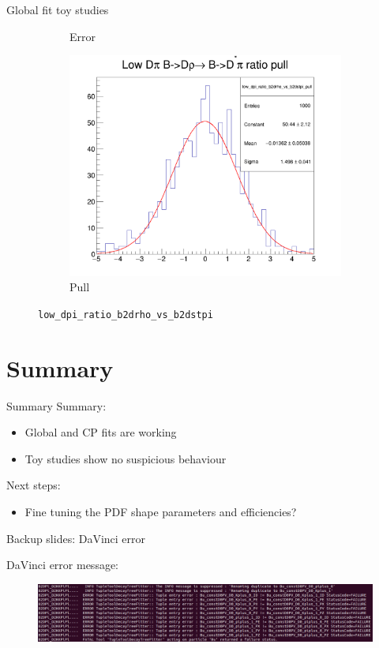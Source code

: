 \documentclass{beamer}
\begin{document}
\begin{frame}{Global fit toy studies}
\begin{figure}
\begin{subfigure}{0.33\textwidth}
      \caption{Error}
    \end{subfigure}%
    \begin{subfigure}{0.33\textwidth}
      \includegraphics[width = 1.0\textwidth]{Plots/low_dpi_ratio_b2drho_vs_b2dstpi_pull.png}
      \caption{Pull}
    \end{subfigure}
    \caption{\texttt{low\_dpi\_ratio\_b2drho\_vs\_b2dstpi}}
  \end{figure}
\end{frame}

\section{Summary}
\begin{frame}{Summary}
  Summary:
  \begin{itemize}
    \item{Global and CP fits are working}
    \item{Toy studies show no suspicious behaviour}
  \end{itemize}
  Next steps:
  \begin{itemize}
    \item{Fine tuning the PDF shape parameters and efficiencies?}
  \end{itemize}
\end{frame}

\begin{frame}{Backup slides: DaVinci error}
  \begin{center}
    DaVinci error message:
  \end{center}
  \begin{figure}
    \includegraphics[width = 1\textwidth]{DaVinciError.png}
  \end{figure}
\end{frame}
\end{document}
